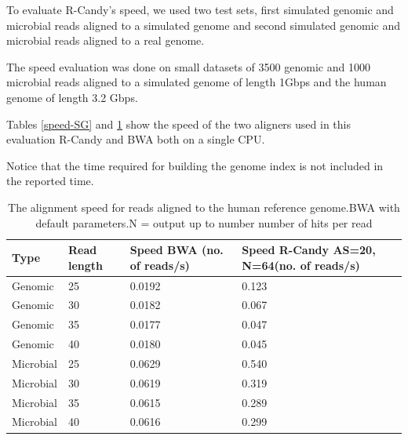 \documentclass[11pt,a4paper]{report}
\begin{document}
To evaluate R-Candy's speed, we used two test sets, first simulated genomic 
and microbial reads aligned to a simulated genome and second simulated genomic
and microbial reads aligned to a real genome.

The speed evaluation was done on small datasets of 3500 genomic and 1000
microbial reads aligned to a simulated genome of length 1Gbps and the 
human genome of length 3.2 Gbps.

Tables \ref{speed-SG} and \ref{speed-RG} show the speed of 
the two aligners used in this evaluation
R-Candy and BWA both on a single CPU.

Notice that the time required for building the genome index is 
not included in the reported time.\\


\begin{table}[H]
  \begin{tabular}{ |  p{2cm} | p{2cm} | p{3cm} | p{3cm} | }
    \hline
  	\textbf{Type} & \textbf{Read length }&\textbf{Speed BWA \hspace{35pt}(no. of reads/s) } 	 
  	& \textbf{Speed R-Candy AS=20, N=64\hspace{35pt}(no. of reads/s)}\\ \hline
  	  
 	  Genomic    & 25  & 0.0192 &   0.123 \\ \hline
      Genomic    & 30  & 0.0182 &   0.067 \\ \hline
      Genomic    & 35  & 0.0177 &   0.047 \\ \hline
 	  Genomic	 & 40  & 0.0180 &   0.045 \\ \hline
 	  Microbial  & 25  & 0.0629 &   0.540 \\ \hline
      Microbial  & 30  & 0.0619 &   0.319 \\ \hline
 	  Microbial  & 35  & 0.0615 &   0.289 \\ \hline
 	  Microbial  & 40  & 0.0616 &   0.299 \\ \hline
 	  
   \end{tabular}
\caption{The alignment speed for reads aligned to the human reference genome.BWA with default parameters.N = output up to number number of hits per read }
\label{speed-RG}
\end{table}
\end{document}
